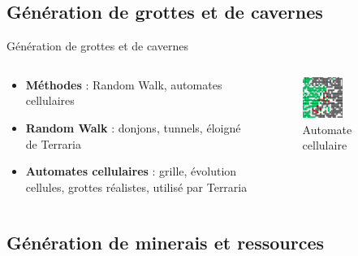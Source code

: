\documentclass[aspectratio=169]{beamer}
\begin{document}
\subsection{Génération de grottes et de cavernes}

\begin{frame}{Génération de grottes et de cavernes}
    \begin{columns}
        \centering
        \begin{column}{0.5\textwidth}
            \centering
            \begin{itemize}
                \item \textbf{Méthodes} : Random Walk, automates cellulaires
                \item \textbf{Random Walk} : donjons, tunnels, éloigné de Terraria
                \item \textbf{Automates cellulaires} : grille, évolution cellules, grottes réalistes, utilisé par Terraria
            \end{itemize}
        \end{column}
        \begin{column}{0.5\textwidth}
            \centering
            \begin{figure}
                \centering
                \captionsetup{format=sanslabel}
                \includegraphics[width=0.5\textwidth]{assets/automate_cellulaire.png}
                \caption{Automate cellulaire}
            \end{figure}
        \end{column}
    \end{columns}
\end{frame}

\subsection{Génération de minerais et ressources}
\end{document}
